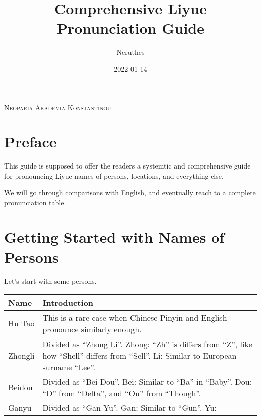 \documentclass[a4paper,12pt]{article}
\title{Comprehensive Liyue Pronunciation Guide}
\author{Neruthes}
\date{2022-01-14}
\begin{document}
\rmfamily


\begin{minipage}{\linewidth}
    \center

    \vspace{15pt}

    {\scshape\sffamily\large Neoparia Akademia Konstantinou}

    \maketitle
\end{minipage}




\section*{Preface}

This guide is supposed to offer the readers a systemtic and comprehensive guide for pronouncing Liyue names of persons, locations,
and everything else.

We will go through comparisons with English, and eventually reach to a complete pronunciation table.


\section{Getting Started with Names of Persons}

Let's start with some persons.

\begin{tabu}{|l|X|}
    \hline
    {Name} & {Introduction} \\
    \hline
    {Hu Tao} & {This is a rare case when Chinese Pinyin and English pronounce similarly enough.} \\
    {Zhongli} & {Divided as ``Zhong Li''. Zhong: ``Zh'' is differs from ``Z'', like how ``Shell'' differs from ``Sell''. Li: Similar to European surname ``Lee''.} \\
    {Beidou} & {Divided as ``Bei Dou''. Bei: Similar to ``Ba'' in ``Baby''. Dou: ``D'' from ``Delta'', and ``Ou'' from ``Though''.} \\
    {Ganyu} & {Divided as ``Gan Yu''. Gan: Similar to ``Gun''. Yu: } \\
    \hline
\end{tabu}
\end{document}
